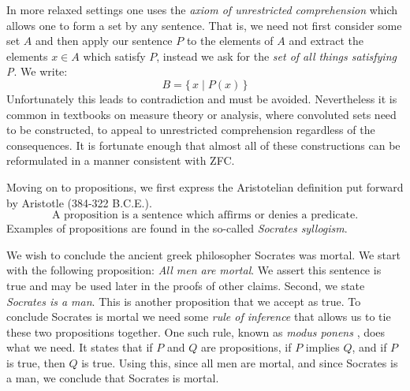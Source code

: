         In more relaxed settings one uses the \textit{axiom of unrestricted}
        \textit{comprehension} which
        allows one to form a set by any sentence. That is, we need not first
        consider some set $A$ and then apply our sentence $P$ to the elements of
        $A$ and extract the elements $x\in{A}$ which satisfy $P$, instead we
        ask for the \textit{set of all things satisfying P}. We write:
        \begin{equation}
            B=\{\,x\;|\;P(x)\,\}
        \end{equation}
        Unfortunately this leads to contradiction and must be avoided.
        Nevertheless it is common in textbooks on measure theory or analysis,
        where convoluted sets need to be constructed, to appeal to unrestricted
        comprehension regardless of the consequences. It is fortunate enough
        that almost all of these constructions can be reformulated in a manner
        consistent with \gls{ZFC}.
        \par\hfill\par
        Moving on to propositions, we first express the Aristotelian
        definition put forward by Aristotle (384-322 B.C.E.).
        \begin{equation}
            \text{A proposition is a sentence which affirms or denies a }
            \text{predicate.}
        \end{equation}
        Examples of propositions are found in the so-called
        \textit{Socrates syllogism}.
        \begin{example}
            We wish to conclude the ancient greek philosopher
            Socrates was mortal. We start with the following
            proposition: \textit{All men are mortal}. We assert this sentence is
            true and may be used later in the proofs of other claims. Second,
            we state \textit{Socrates is a man}. This is another proposition
            that we accept as true. To conclude Socrates is mortal we need some
            \textit{rule of inference} that allows us to tie these two
            propositions together. One such rule, known as
            \textit{modus ponens}%
            , does what we need. It states
            that if $P$ and $Q$ are propositions, if $P$ implies $Q$, and if $P$
            is true, then $Q$ is true. Using this, since all men are mortal, and
            since Socrates is a man, we conclude that Socrates is mortal.
        \end{example}

